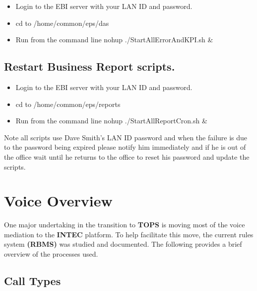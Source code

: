 \documentclass[12pt,twoside]{article}
\begin{document}
\begin{itemize}
\item Login to the EBI server with your LAN ID and password.
\item cd to /home/common/eps/das
\item Run from the command line nohup ./StartAllErrorAndKPI.sh \&
\end{itemize}
 
\subsection{Restart Business Report scripts.}
\label{sec-4-9}

\begin{itemize}
\item Login to the EBI server with your LAN ID and password.
\item cd to /home/common/eps/reports
\item Run from the command line nohup ./StartAllReportCron.sh \&
\end{itemize}
 
   Note all scripts use Dave Smith's LAN ID password and when the failure is due to the password being expired please notify him immediately and if he is out of the office wait until he returns to the office to reset his password and update the scripts.

\newpage
\section{Voice Overview}
\label{sec-5}

\normalsize
  One major undertaking in the transition to \textbf{TOPS} is moving most of
  the voice mediation to the \textbf{INTEC} platform. To help facilitate this
  move, the current rules system \textbf{(RBMS)} was studied and
  documented. The following provides a brief overview of the processes
  used. 
\subsection{Call Types}
\label{sec-5-1}
\end{document}
